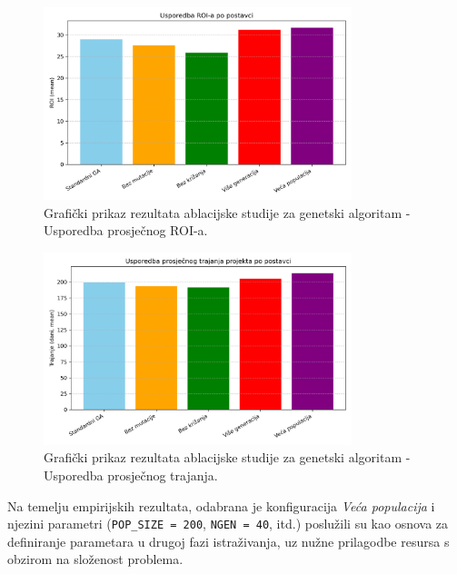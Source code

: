 \begin{figure}[H]
        \centering
        \includegraphics[width=0.8\textwidth]{slike/ga_usporedba_roi.png}
        \caption{Grafički prikaz rezultata ablacijske studije za genetski algoritam - Usporedba prosječnog ROI-a.}
        \label{fig:ga_roi}
\end{figure}
    \begin{figure}[H]
        \centering
        \includegraphics[width=0.8\textwidth]{slike/ga_usporedba_trajanje.png}
        \caption{Grafički prikaz rezultata ablacijske studije za genetski algoritam - Usporedba prosječnog trajanja.}
        \label{fig:ga_trajanje}
\end{figure}

Na temelju empirijskih rezultata, odabrana je konfiguracija \emph{Veća populacija} i njezini parametri (\texttt{POP\_SIZE = 200}, \texttt{NGEN = 40}, itd.) poslužili su kao osnova za definiranje parametara u drugoj fazi istraživanja, uz nužne prilagodbe resursa s obzirom na složenost problema.

